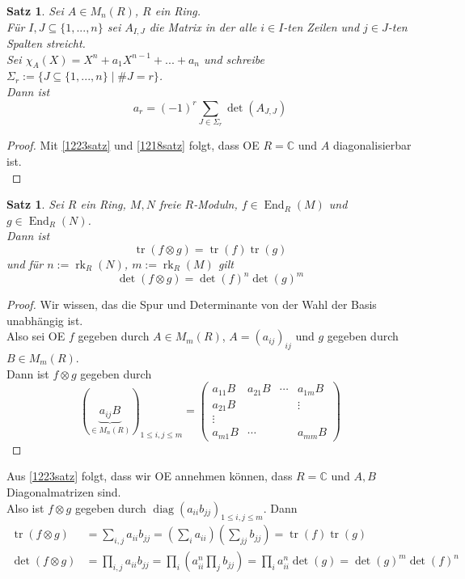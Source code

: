 \documentclass[10pt,a4paper]{article}
\newcommand{\C}{\ensuremath{\mathbb{C}}}
\newcommand{\End}{\operatorname{End}}
\newcommand{\tr}{\ensuremath{\operatorname{tr}}}
\newcommand{\rk}{\ensuremath{\operatorname{rk}}}
\newcommand{\diag}{\ensuremath{\operatorname{diag}}}
\newcounter{thm}[section]
\theoremstyle{definition}
\theoremstyle{plain}
\newtheorem{satz}[thm]{Satz}
\theoremstyle{remark}
\begin{document}
\begin{satz}
	Sei $A\in M_n(R)$, $R$ ein Ring.\\
	Für $I,J\subseteq\{1,...,n\}$ sei $A_{I,J}$ die Matrix in der alle $i\in I$-ten Zeilen und $j\in J$-ten Spalten streicht.\\
	Sei $\chi_A(X)=X^n+a_{1}X^{n-1}+...+a_n$ und schreibe $\Sigma_r:=\{J\subseteq\{1,...,n\}\mid\#J=r\}$.\\
	Dann ist
	\[a_r=(-1)^r\sum_{J\in\Sigma_r}\det(A_{J,J})\]
\end{satz}
\begin{proof}
	Mit \ref{1223satz} und \ref{1218satz} folgt, dass OE $R=\C$ und $A$ diagonalisierbar ist.\\
\end{proof}



\begin{satz}
	Sei $R$ ein Ring, $M,N$ freie $R$-Moduln, $f\in\End_R(M)$ und $g\in\End_R(N)$.\\
	Dann ist 
	\[\tr(f\otimes g)=\tr(f)\tr(g)\]
	und für $n:=\rk_R(N)$, $m:=\rk_R(M)$ gilt
	\[\det(f\otimes g)=\det(f)^n\det(g)^m\]
\end{satz}
\begin{proof}
	Wir wissen, das die Spur und Determinante von der Wahl der Basis unabhängig ist.\\
	Also sei OE $f$ gegeben durch $A\in M_m(R)$, $A=(a_{ij})_{ij}$ und $g$ gegeben durch $B\in M_m(R)$.\\
	Dann ist $f\otimes g$ gegeben durch
	\[(\underbrace{a_{ij}B}_{\in M_n(R)})_{1\leq i,j\leq m}=
	\begin{pmatrix}
	a_{11}B&a_{21}B&\cdots &a_{1m}B\\
	a_{21}B&&&\vdots\\
	\vdots&&&\\
	a_{m1}B&\cdots&&a_{mm}B
	\end{pmatrix}\]
\end{proof}
Aus \ref{1223satz} folgt, dass wir OE annehmen können, dass $R=\C$ und $A,B$ Diagonalmatrizen sind.\\
Also ist $f\otimes g$ gegeben durch $\diag(a_{ii}b_{jj})_{1\le i,j\le m}$. Dann
\begin{align*}
\tr(f\otimes g)&=\sum_{i,j}a_{ii}b_{jj}=\left(\sum_{i}a_{ii}\right)\left(\sum_{jj}b_{jj}\right)=\tr(f)\tr(g)\\
\det(f\otimes g)&=\prod_{i,j}a_{ii}b_{jj}=\prod_i\left(a_{ii}^n\prod_jb_{jj}\right)=\prod_i a_{ii}^n\det(g)=\det(g)^m\det(f)^n
\end{align*}
\end{document}

